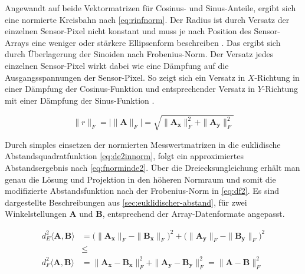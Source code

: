 \clearpage


Angewandt auf beide Vektormatrizen für Cosinus- und Sinus-Anteile, ergibt sich eine normierte Kreisbahn nach \autoref{eq:rinfnorm}. Der Radius ist durch Versatz der einzelnen Sensor-Pixel nicht konstant und muss je nach Position des Sensor-Arrays eine weniger oder stärkere Ellipsenform beschreiben \cite{Schuethe2019}. Das ergibt sich durch Überlagerung der Sinoiden nach Frobenius-Norm. Der Versatz jedes einzelnen Sensor-Pixel wirkt dabei wie eine Dämpfung auf die Ausgangsspannungen der Sensor-Pixel. So zeigt sich ein Versatz in $X$-Richtung in einer Dämpfung der Cosinus-Funktion und entsprechender Versatz in $Y$-Richtung mit einer Dämpfung der Sinus-Funktion \cite{Schuethe2019}.


\begin{equation}\label{eq:rinfnorm}
	\|r\|_F = \big|\|\mathbf{A}\|_F\big| = \sqrt{\|\mathbf{A_x}\|_F^2 + \|\mathbf{A_y}\|_F^2}
\end{equation}


Durch simples einsetzen der normierten Messwertmatrizen in die euklidische Abstandsquadratfunktion \autoref{eq:de2innorm}, folgt ein approximiertes Abstandsergebnis nach \autoref{eq:fnorminde2}. Über die Dreiecksungleichung erhält man genau die Lösung und Projektion in den höheren Normraum \cite{Plum2012}\cite{vandeGeijn2014} und somit die modifizierte Abstandsfunktion nach der Frobenius-Norm \cite{Schuethe2020}\cite{Schuethe2020b} in \autoref{eq:df2}. Es sind dargestellte Beschreibungen aus \autoref{sec:euklidischer-abstand}, für zwei Winkelstellungen $\mathbf{A}$ und $\mathbf{B}$, entsprechend der Array-Datenformate angepasst.


\begin{align}
\label{eq:fnorminde2}
d_E^2\langle\mathbf{A},\mathbf{B}\rangle &= \big(\|\mathbf{A_x}\|_F - \|\mathbf{B_x}\|_F\big)^2 + \big(\|\mathbf{A_y}\|_F - \|\mathbf{B_y}\|_F\big)^2 \\
&\le \nonumber \\
\label{eq:df2}
d_F^2\langle\mathbf{A},\mathbf{B}\rangle &= \|\mathbf{A_x} - \mathbf{B_x}\|_F^2 + \|\mathbf{A_y} - \mathbf{B_y}\|_F^2 = \|\mathbf{A} - \mathbf{B}\|_F^2
\end{align}


\clearpage

